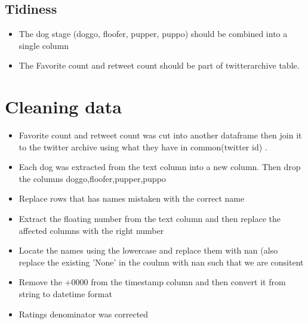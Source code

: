\documentclass[10pt,a4paper]{article}
\begin{document}
\subsection*{ Tidiness}
\begin{itemize}
\item The dog stage (doggo, floofer, pupper, puppo) should be combined into a single column 
\item The Favorite count and retweet count should be part of twitterarchive table.
\end{itemize}


\section*{Cleaning data}
\begin{itemize}
\item Favorite count and retweet count was cut  into another dataframe then join it to the twitter archive using what they have in common(twitter id) .
\item Each dog was extracted  from the text column into a new column. Then drop the columns doggo,floofer,pupper,puppo
\item Replace rows that has names mistaken with the correct name 
\item Extract the floating number from the text column and then replace the affected columns with the right number
\item Locate the names using the lowercase and replace them with nan (also replace the existing 'None' in the coulmn with nan such that we are consitent
\item Remove the +0000 from the timestamp column and then convert it from string to datetime format
\item Ratings denominator was corrected 
\end{itemize}
\end{document}
